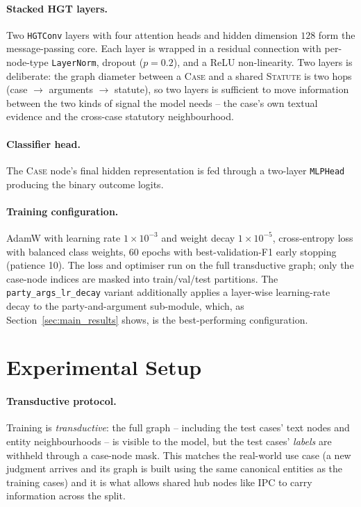 \paragraph{Stacked HGT layers.} Two \texttt{HGTConv} layers with
four attention heads and hidden dimension $128$ form the
message-passing core. Each layer is wrapped in a residual connection
with per-node-type \texttt{LayerNorm}, dropout ($p=0.2$), and a ReLU
non-linearity. Two layers is deliberate: the graph diameter between a
\textsc{Case} and a shared \textsc{Statute} is two hops
(case $\to$ arguments $\to$ statute), so two layers is sufficient to
move information between the two kinds of signal the model needs --
the case's own textual evidence and the cross-case statutory
neighbourhood.

\paragraph{Classifier head.} The \textsc{Case} node's final hidden
representation is fed through a two-layer \texttt{MLPHead} producing
the binary outcome logits.

\paragraph{Training configuration.} AdamW with learning rate
$1\!\times\!10^{-3}$ and weight decay $1\!\times\!10^{-5}$, cross-entropy
loss with balanced class weights, 60 epochs with best-validation-F1
early stopping (patience 10). The loss and optimiser run on the full
transductive graph; only the case-node indices are masked into
train/val/test partitions. The \texttt{party\_args\_lr\_decay}
variant additionally applies a layer-wise learning-rate decay to the
party-and-argument sub-module, which, as Section~\ref{sec:main_results}
shows, is the best-performing configuration.

\section{Experimental Setup}

\paragraph{Transductive protocol.} Training is \emph{transductive}: the
full graph -- including the test cases' text nodes and entity
neighbourhoods -- is visible to the model, but the test cases'
\emph{labels} are withheld through a case-node mask. This matches the
real-world use case (a new judgment arrives and its graph is built
using the same canonical entities as the training cases) and it is
what allows shared hub nodes like \textsc{IPC} to carry information
across the split.


